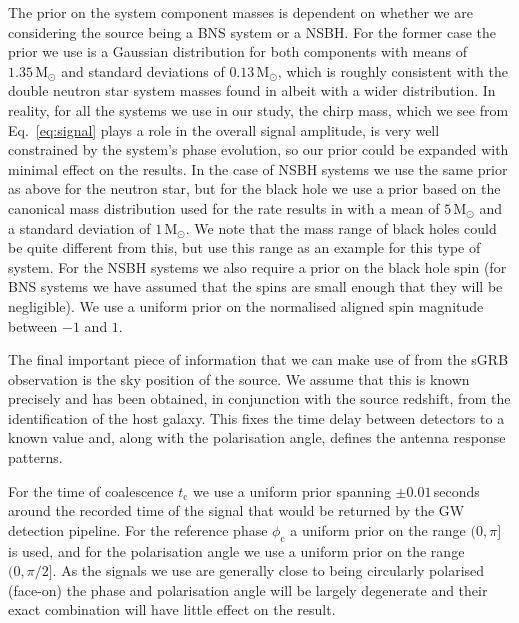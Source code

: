 \documentclass[prd, twocolumn, lengthcheck, superscriptaddress, showpacs, letterpaper, nofootinbib]{revtex4-1}
\begin{document}
The prior on the system component masses is dependent on whether we are
considering the source being a \ac{BNS} system or a \ac{NSBH}. For the former
case the prior we use is a Gaussian distribution for both components with means
of $1.35\,\textrm{M}_{\odot}$ and standard deviations of
$0.13\,\textrm{M}_{\odot}$, which is roughly consistent with the double neutron star system
masses found in \cite{2012ApJ...757...55O} albeit with a wider distribution. In reality, for all 
the systems we use in our study, the chirp mass, which we see from Eq.~\ref{eq:signal}
plays a role in the overall signal amplitude, is very well constrained by the
system's phase evolution, so our prior could be expanded with minimal effect on
the results. In the case of \ac{NSBH} systems we use the same prior as above
for the neutron star, but for the black hole we use a prior based on the
canonical mass distribution used for the rate results in
\cite{2012PhRvD..85h2002A} with a mean of $5\,\textrm{M}_{\odot}$ and a
standard deviation of $1\,\textrm{M}_{\odot}$. We note that the mass range of
black holes could be quite different from this, but use this range as an
example for this type of system. For the \ac{NSBH} systems we also require a
prior on the black hole spin (for \ac{BNS} systems we have assumed that the
spins are small enough that they will be negligible). We use a uniform prior on
the normalised aligned spin magnitude between $-1$ and $1$.

The final important piece of information that we can make use of from the
\ac{sGRB} observation is the sky position of the source. We assume that this is 
known precisely and has been obtained, in conjunction with the source redshift,
from the identification of the host galaxy. This fixes the time delay between detectors to a known 
value and, along with the polarisation angle, defines the antenna response patterns.

For the time of coalescence $t_{\mathrm{c}}$ we use a uniform prior spanning
$\pm0.01$\,seconds around the recorded time of the signal that would be
returned by the \ac{GW} detection pipeline. For the reference phase
$\phi_{\mathrm{c}}$ a uniform prior on the range $(0,\pi]$ is used, and for the
polarisation angle we use a uniform prior on the range $(0,\pi/2]$. As the
signals we use are generally close to being circularly polarised (face-on) the
phase and polarisation angle will be largely degenerate and their exact
combination will have little effect on the result.
\end{document}
